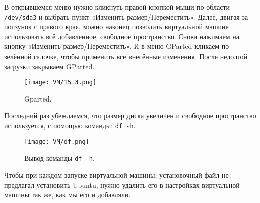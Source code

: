 В открывшемся меню нужно кликнуть правой кнопкой мыши по области \texttt{/dev/sda3} и выбрать пункт «Изменить размер/Переместить». Далее, двигая за ползунок с правого края, можно наконец позволить виртуальной машине использовать всё добавленное, свободное пространство. Снова нажимаем на кнопку «Изменить размер/Переместить». И в меню GParted  кликаем по зелённой галочке, чтобы применить все внесённые изменения. После недолгой загрузки закрываем GParted.

\begin{figure}[h]
		\centering
		\texttt{[image: VM/15.3.png]}
\caption{Gparted.}
\label{ris:image}
\end{figure}

Последний раз убеждаемся, что размер диска увеличен и свободное пространство используется, с помощью команды: \texttt{df -h}.

\begin{figure}[h]
		\centering
		\texttt{[image: VM/df.png]}
\caption{Вывод команды \texttt{df -h}.}
\label{ris:image}
\end{figure}

Чтобы при каждом запуске виртуальной машины, установочный файл не предлагал установить Ubuntu, нужно удалить его в настройках виртуальной машины так же, как мы его и добавляли.